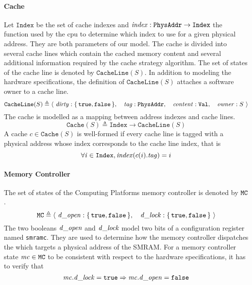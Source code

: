 \paragraph{Cache}
%
Let $\texttt{Index}$ be the set of cache indexes and
$\mathit{index} : \texttt{PhysAddr} \rightarrow \texttt{Index}$ the function used
by the \ac{cpu} to determine which index to use for a given physical address.
%
They are both parameters of our model.
%
The cache is divided into several cache lines which contain the cached memory
content and several additional information required by the cache strategy
algorithm.
%
The set of states of the cache line is denoted by $\texttt{CacheLine}(S)$.
%
In addition to modeling the hardware specifications, the definition of
$\texttt{CacheLine}(S)$ attaches a software owner to a cache line.
%
\[
  \texttt{CacheLine}(S) \triangleq \langle~\mathit{dirty} :
  \{\,\mathtt{true}, \mathtt{false}\,\},\quad\mathit{tag} :
  \texttt{PhysAddr},\quad\mathit{content}: \texttt{Val},\quad\mathit{owner}:
  S~\rangle
\]
%
The cache is modelled as a mapping between address indexes and cache lines.
%
\[
  \texttt{Cache}(S) \triangleq \texttt{Index} \rightarrow \texttt{CacheLine}(S)
\]
%
A cache \( c \in \texttt{Cache}(S) \) is well-formed if every cache line is tagged with a physical address
whose index corresponds to the cache line index, that is
%
\[
  \forall \mathit{i} \in \texttt{Index}, \mathit{index}(c(i).\mathit{tag}) = i
\]

\paragraph{Memory Controller}
%
The set of states of the  Computing Platforms memory
controller is denoted by $\mathtt{MC}$.
%
\[
  \texttt{MC} \triangleq \langle~\mathit{d\_open}: \{\,\mathtt{true},
    \mathtt{false}\,\},\quad\mathit{d\_lock}: \{\,\mathtt{true},
    \mathtt{false}\,\}~\rangle
\]
%
The two booleans $\mathit{d\_open}$ and $\mathit{d\_lock}$ model two bits of a
configuration register named \texttt{smramc}.
%
They are used to determine how the memory controller dispatches the \IO which
targets a physical address of the SMRAM.
%
For a memory controller state $\mathit{mc} \in \texttt{MC}$ to be consistent with
respect to the hardware specifications, it has to verify that
%
\[
  \mathit{mc}.\mathit{d\_lock} = \mathtt{true} \Rightarrow \mathit{mc}.\mathit{d\_open} =
  \mathtt{false}
\]

